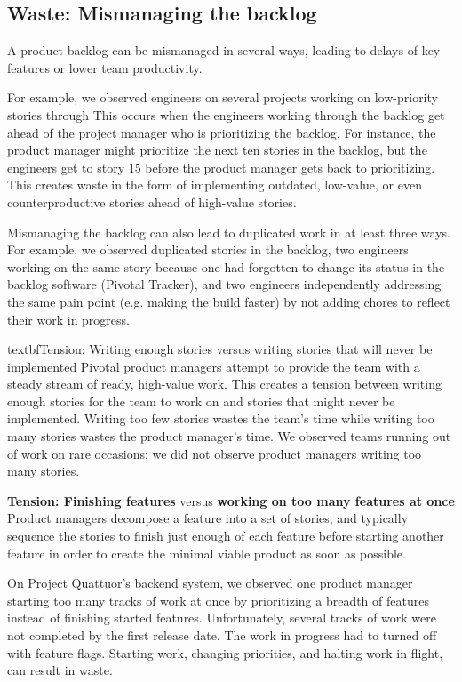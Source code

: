 \subsection{Waste: Mismanaging the backlog}
A product backlog can be mismanaged in several ways, leading to delays of key features or lower team productivity. 

For example, we observed engineers on several projects working on low-priority stories through  This occurs when the engineers working through the backlog get ahead of the project manager who is prioritizing the backlog. For instance, the product manager might prioritize the next ten stories in the backlog, but the engineers get to story 15 before the product manager gets back to prioritizing. This creates waste in the form of implementing outdated, low-value, or even counterproductive stories ahead of high-value stories.   

Mismanaging the backlog can also lead to duplicated work in at least three ways. For example, we observed duplicated stories in the backlog, two engineers working on the same story because one had forgotten to change its status in the backlog software (Pivotal Tracker), and two engineers independently addressing the same pain point (e.g. making the build faster) by not adding chores to reflect their work in progress.

textbf{Tension: Writing enough stories versus writing stories that will never be implemented}
Pivotal product managers attempt to provide the team with a steady stream of ready, high-value work. This creates a tension between writing enough stories for the team to work on and  stories that might never be implemented. Writing too few stories wastes the team's time while writing too many stories wastes the product manager's time. We observed teams running out of work on rare occasions; we did not observe product managers writing too many stories.  

\textbf{Tension: Finishing features} versus \textbf{working on too many features at once}
Product managers decompose a feature into a set of stories, and typically sequence the stories to finish just enough of each feature before starting another feature in order to create the minimal viable product as soon as possible. 

On Project Quattuor's backend system, we observed one product manager starting too many tracks of work at once by prioritizing a breadth of features instead of finishing started features. Unfortunately, several tracks of work were not completed by the first release date. The work in progress had to turned off with feature flags. Starting work, changing priorities, and halting work  in flight, can result in waste.

